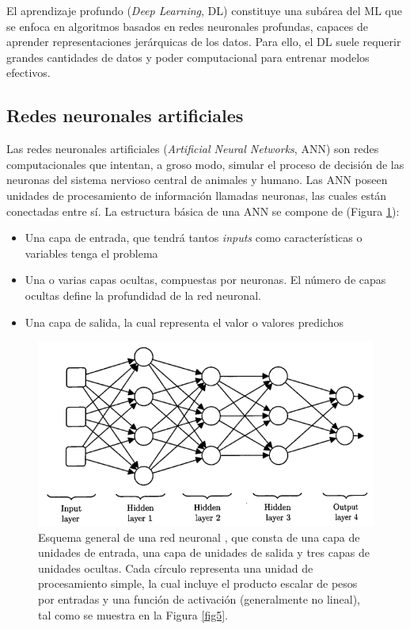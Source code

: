 El aprendizaje profundo (\textit{Deep Learning}, DL) \cite{26,78} constituye una subárea del ML que se enfoca en algoritmos basados en redes neuronales profundas, capaces de aprender representaciones jerárquicas de los datos. Para ello, el DL suele requerir grandes cantidades de datos y poder computacional para entrenar modelos efectivos.

\subsection{Redes neuronales artificiales}
Las redes neuronales artificiales (\textit{Artificial Neural Networks}, ANN) \cite{24, 25, 27} son redes computacionales que intentan, a groso modo, simular el proceso de decisión de las neuronas del sistema nervioso central de animales y humano. Las ANN poseen unidades de procesamiento de información llamadas neuronas, las cuales están conectadas entre sí. La estructura básica de una ANN se compone de (Figura \ref{fig4}):
\begin{itemize}
	\item Una capa de entrada, que tendrá tantos \textit{inputs} como características o variables tenga el problema
	\item Una o varias capas ocultas, compuestas por neuronas. El número de capas ocultas define la profundidad de la red neuronal.
	\item Una capa de salida, la cual representa el valor o valores predichos
\end{itemize} 

\begin{figure}[h]
	\centering
	\includegraphics[scale=0.5]{imagenes/cap2/neural-network.png}
	\caption[Esquema de red neuronal.]{Esquema general de una red neuronal \cite{26}, que consta de una capa de unidades de entrada, una capa de unidades de salida y tres capas de unidades ocultas. Cada círculo representa una unidad de procesamiento simple, la cual incluye el producto escalar de pesos por entradas y una función de activación (generalmente no lineal), tal como se muestra en la Figura \ref{fig5}.}
	\label{fig4}
\end{figure}

